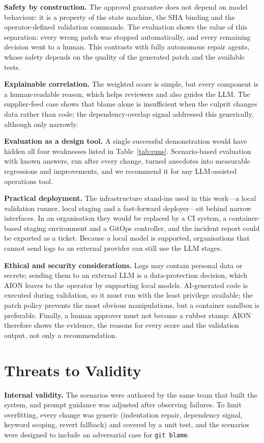 \documentclass[conference]{IEEEtran}
\begin{document}
\textbf{Safety by construction.} The approval guarantee does not depend on model behaviour: it is a property of the state machine, the SHA binding and the operator-defined validation commands. The evaluation shows the value of this separation: every wrong patch was stopped automatically, and every remaining decision went to a human. This contrasts with fully autonomous repair agents, whose safety depends on the quality of the generated patch and the available tests.

\textbf{Explainable correlation.} The weighted score is simple, but every component is a human-readable reason, which helps reviewers and also guides the LLM. The supplier-feed case shows that blame alone is insufficient when the culprit changes data rather than code; the dependency-overlap signal addressed this generically, although only narrowly.

\textbf{Evaluation as a design tool.} A single successful demonstration would have hidden all four weaknesses listed in Table~\ref{tab:runs}. Scenario-based evaluation with known answers, run after every change, turned anecdotes into measurable regressions and improvements, and we recommend it for any LLM-assisted operations tool.

\textbf{Practical deployment.} The infrastructure stand-ins used in this work---a local validation runner, local staging and a fast-forward deployer---sit behind narrow interfaces. In an organisation they would be replaced by a CI system, a container-based staging environment and a GitOps controller, and the incident report could be exported as a ticket. Because a local model is supported, organisations that cannot send logs to an external provider can still use the LLM stages.

\textbf{Ethical and security considerations.} Logs may contain personal data or secrets; sending them to an external LLM is a data-protection decision, which AION leaves to the operator by supporting local models. AI-generated code is executed during validation, so it must run with the least privilege available; the patch policy prevents the most obvious manipulations, but a container sandbox is preferable. Finally, a human approver must not become a rubber stamp: AION therefore shows the evidence, the reasons for every score and the validation output, not only a recommendation.

\section{Threats to Validity}
\label{sec:threats}
\textbf{Internal validity.} The scenarios were authored by the same team that built the system, and prompt guidance was adjusted after observing failures. To limit overfitting, every change was generic (indentation repair, dependency signal, keyword scoping, revert fallback) and covered by a unit test, and the scenarios were designed to include an adversarial case for \texttt{git blame}.
\end{document}
